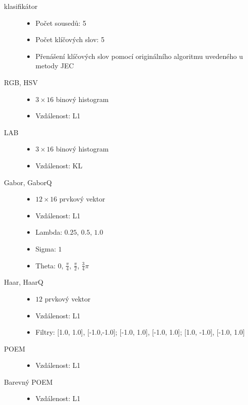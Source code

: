 \documentclass[czech,BP]{thesiskiv}
\begin{document}
\begin{description}
	\item[klasifikátor] \hfill 
		\begin{itemize}	
			\item Počet sousedů: 5
			\item Počet klíčových slov: 5
			\item Přenášení klíčových slov pomocí originálního algoritmu uvedeného u metody JEC
		\end{itemize}
	\item[RGB, HSV] \hfill 
		\begin{itemize} 
			\item $3\times 16$ binový histogram
			\item Vzdálenost: L1 	
		\end{itemize}
	\item[LAB] \hfill 
		\begin{itemize} 
			\item $3\times 16$ binový histogram
			\item Vzdálenost: KL 	
		\end{itemize}		
	\item[Gabor, GaborQ] \hfill 
		\begin{itemize} 
			\item $12 \times 16$ prvkový vektor
			\item Vzdálenost: L1 
			\item Lambda: $0.25$, $0.5$, $1.0$ 
			\item Sigma: $1$
			\item Theta: $0$, $\frac{\pi}{4}$, $\frac{\pi}{2}$, $\frac{3}{4}\pi$  	
		\end{itemize}
	\item[Haar, HaarQ] \hfill 
		\begin{itemize} 
			\item $12$ prvkový vektor
			\item Vzdálenost: L1 
			\item Filtry: [1.0, 1.0], [-1.0,-1.0]; [-1.0, 1.0], [-1.0, 1.0]; [1.0, -1.0], [-1.0, 1.0]  	
		\end{itemize}
	\item[POEM] \hfill 
		\begin{itemize} 
			\item Vzdálenost: L1 	
		\end{itemize}
	\item[Barevný POEM] \hfill 
		\begin{itemize} 
			\item Vzdálenost: L1  	
		\end{itemize}
\end{description}
\end{document}
